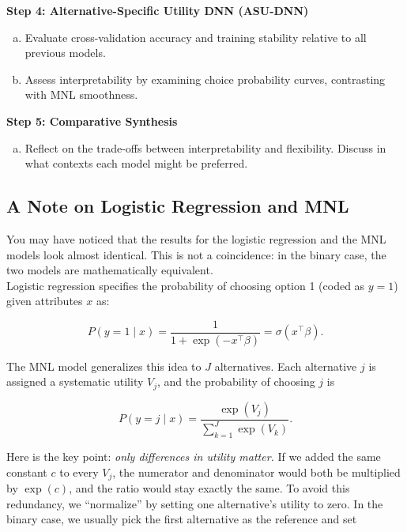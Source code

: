 \documentclass[11pt]{article}
\begin{document}
\noindent\textbf{Step 4: Alternative-Specific Utility DNN (ASU-DNN)}
\begin{enumerate}[(a)]
\item Evaluate cross-validation accuracy and training stability relative to all previous models.  
\item Assess interpretability by examining choice probability curves, contrasting with MNL smoothness.
\end{enumerate}

\noindent\textbf{Step 5: Comparative Synthesis}
\begin{enumerate}[(a)]
\item Reflect on the trade-offs between interpretability and flexibility. Discuss in what contexts each model might be preferred.  
\end{enumerate}

\subsection*{A Note on Logistic Regression and MNL}

You may have noticed that the results for the logistic regression and the MNL models look almost identical. This is not a coincidence: in the binary case, the two models are mathematically equivalent.\\

Logistic regression specifies the probability of choosing option 1 (coded as $y=1$) given attributes $x$ as:

\begin{equation}
P(y=1 \mid x) = \frac{1}{1 + \exp(-x^\top \beta)} = \sigma(x^\top \beta).
\end{equation}

The MNL model generalizes this idea to $J$ alternatives. Each alternative $j$ is assigned a systematic utility $V_j$, and the probability of choosing $j$ is

\begin{equation}
P(y=j \mid x) = \frac{\exp(V_j)}{\sum_{k=1}^J \exp(V_k)}.
\end{equation}  

Here is the key point: \textit{only differences in utility matter.} If we added the same constant $c$ to every $V_j$, the numerator and denominator would both be multiplied by $\exp(c)$, and the ratio would stay exactly the same. To avoid this redundancy, we “normalize” by setting one alternative’s utility to zero. In the binary case, we usually pick the first alternative as the reference and set  
\end{document}
